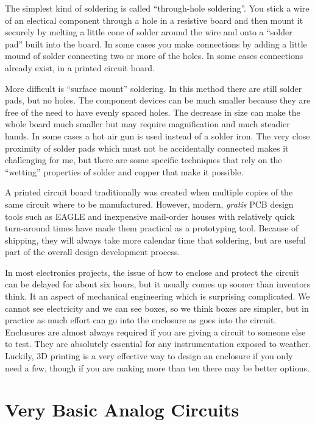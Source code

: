 \documentclass[
	fontsize=10pt, %
	twoside=false, %
	secnumdepth=1, %
]{kaobook}
\begin{document}
The simplest kind of soldering is called ``through-hole soldering''.
You stick a wire of an electical component through a hole in a
resistive board and then mount it securely by melting a little cone
of solder around the wire and onto a ``solder pad'' built into the
board. In some cases you make connections by adding a little mound
of solder connecting two or more of the holes. In some cases
connections already exist, in a printed circuit board.

More difficult is ``surface mount'' soldering. In this method
there are still solder pads, but no holes. The component devices
can be much smaller because they are free of the need to have
evenly spaced holes. The decrease in size can make the whole board
much smaller but may require magnification and much steadier hands.
In some cases a hot air gun is used instead of a solder iron.
The very close proximity of solder pads which must not be accidentally
connected makes it challenging for me, but there are some specific
techniques that rely on the ``wetting'' properties of solder and
copper that make it possible.

A printed circuit board traditionally was created when multiple copies of the same
circuit where to be manufactured. However, modern, {\em gratis} PCB design
tools such as EAGLE\cite{eaglecad} and inexpensive mail-order houses with
relatively quick turn-around times have made them practical
as a prototyping tool. Because of shipping, they will always
take more calendar time that soldering, but are useful part of the
overall design development process.

In most electronics projects, the issue of how to enclose and
protect the circuit can be delayed for about six hours, but
it usually comes up sooner than inventors think. It an aspect
of mechanical engineering which is surprising complicated.
We cannot see electricity and we can see boxes, so we think
boxes are simpler, but in practice as much effort can go into
the enclosure as goes into the circuit. Enclusures are almost
always required if you are giving a circuit to someone else to
test. They are absolutely essential for any instrumentation
exposed to weather. Luckily, 3D printing is a very effective
way to design an enclosure if you only need a few, though
if you are making more than ten there may be better options.

\section{Very Basic Analog Circuits}
\end{document}
